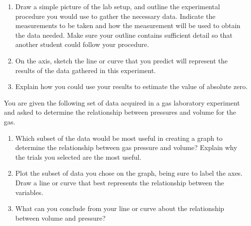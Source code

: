 \documentclass{../../../oss-apphys}
\begin{document}
\begin{enumerate}[leftmargin=15pt]
\begin{enumerate}[leftmargin=18pt]
  \item Draw a simple picture of the lab setup, and outline the experimental
    procedure you would use to gather the necessary data. Indicate the
    measurements to be taken and how the measurement will be used to obtain the
    data needed. Make sure your outline contains sufficient detail so that
    another student could follow your procedure.
    \vspace{1.75in}
  \item On the axis, sketch the line or curve that you predict will represent
    the results of the data gathered in this experiment.
    \begin{center}
    \end{center}
    
  \item Explain how you could use your results to estimate the value of
    absolute zero.
  \end{enumerate}

  You are given the following set of data acquired in a gas laboratory
  experiment and asked to determine the relationship between pressures and
  volume for the gas.
  \begin{center}
    \vspace{-.1in}
  \end{center}
  \begin{enumerate}[start=5]
  \item Which subset of the data would be most useful in creating a graph to
    determine the relationship between gas pressure and volume? Explain why the
    trials you selected are the most useful.
    \vspace{1.25in}
    
  \item Plot the subset of data you chose on the graph, being sure to label the
    axes. Draw a line or curve that best represents the relationship between
    the variables.
    \begin{center}
    \end{center}
  \item What can you conclude from your line or curve about the relationship
    between volume and pressure?
  \end{enumerate}
\end{enumerate}
\end{document}
